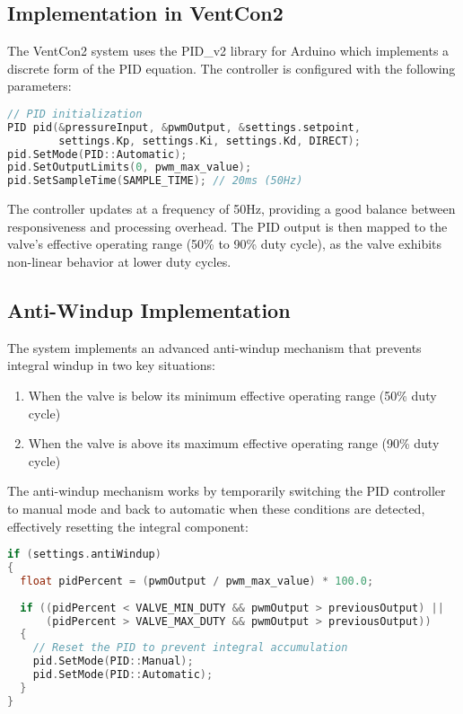 \documentclass[a4paper,11pt]{article}
\begin{document}
\subsection{Implementation in VentCon2}

The VentCon2 system uses the PID\_v2 library for Arduino which implements a discrete form of the PID equation. The controller is configured with the following parameters:

\begin{lstlisting}[language=C++, caption=PID Configuration]
// PID initialization
PID pid(&pressureInput, &pwmOutput, &settings.setpoint, 
        settings.Kp, settings.Ki, settings.Kd, DIRECT);
pid.SetMode(PID::Automatic);
pid.SetOutputLimits(0, pwm_max_value);
pid.SetSampleTime(SAMPLE_TIME); // 20ms (50Hz)
\end{lstlisting}

The controller updates at a frequency of 50Hz, providing a good balance between responsiveness and processing overhead. The PID output is then mapped to the valve's effective operating range (50\% to 90\% duty cycle), as the valve exhibits non-linear behavior at lower duty cycles.

\subsection{Anti-Windup Implementation}

The system implements an advanced anti-windup mechanism that prevents integral windup in two key situations:

\begin{enumerate}
    \item When the valve is below its minimum effective operating range (50\% duty cycle)
    \item When the valve is above its maximum effective operating range (90\% duty cycle)
\end{enumerate}

The anti-windup mechanism works by temporarily switching the PID controller to manual mode and back to automatic when these conditions are detected, effectively resetting the integral component:

\begin{lstlisting}[language=C++, caption=Anti-Windup Implementation]
if (settings.antiWindup) 
{
  float pidPercent = (pwmOutput / pwm_max_value) * 100.0;
  
  if ((pidPercent < VALVE_MIN_DUTY && pwmOutput > previousOutput) ||
      (pidPercent > VALVE_MAX_DUTY && pwmOutput > previousOutput)) 
  {
    // Reset the PID to prevent integral accumulation
    pid.SetMode(PID::Manual);
    pid.SetMode(PID::Automatic);
  }
}
\end{lstlisting}
\end{document}

